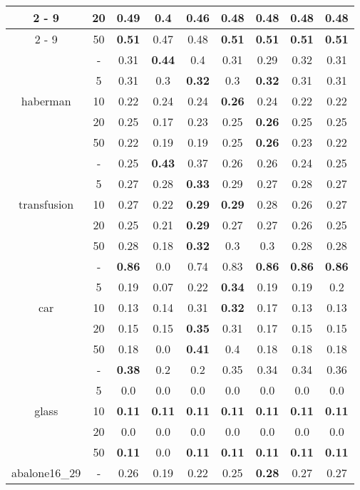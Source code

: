 \documentclass{article}%
\begin{document}
\begin{longtable}{c|c|ccccccc}
\cline{2%
-%
9}%
&20&\textbf{0.49}&0.4&0.46&0.48&0.48&0.48&0.48\\%
\cline{2%
-%
9}%
&50&\textbf{0.51}&0.47&0.48&\textbf{0.51}&\textbf{0.51}&\textbf{0.51}&\textbf{0.51}\\%
\hline%
\multirow{5}{*}{haberman}&{-}&0.31&\textbf{0.44}&0.4&0.31&0.29&0.32&0.31\\%
\cline{2%
-%
9}%
&5&0.31&0.3&\textbf{0.32}&0.3&\textbf{0.32}&0.31&0.31\\%
\cline{2%
-%
9}%
&10&0.22&0.24&0.24&\textbf{0.26}&0.24&0.22&0.22\\%
\cline{2%
-%
9}%
&20&0.25&0.17&0.23&0.25&\textbf{0.26}&0.25&0.25\\%
\cline{2%
-%
9}%
&50&0.22&0.19&0.19&0.25&\textbf{0.26}&0.23&0.22\\%
\hline%
\multirow{5}{*}{transfusion}&{-}&0.25&\textbf{0.43}&0.37&0.26&0.26&0.24&0.25\\%
\cline{2%
-%
9}%
&5&0.27&0.28&\textbf{0.33}&0.29&0.27&0.28&0.27\\%
\cline{2%
-%
9}%
&10&0.27&0.22&\textbf{0.29}&\textbf{0.29}&0.28&0.26&0.27\\%
\cline{2%
-%
9}%
&20&0.25&0.21&\textbf{0.29}&0.27&0.27&0.26&0.25\\%
\cline{2%
-%
9}%
&50&0.28&0.18&\textbf{0.32}&0.3&0.3&0.28&0.28\\%
\hline%
\multirow{5}{*}{car}&{-}&\textbf{0.86}&0.0&0.74&0.83&\textbf{0.86}&\textbf{0.86}&\textbf{0.86}\\%
\cline{2%
-%
9}%
&5&0.19&0.07&0.22&\textbf{0.34}&0.19&0.19&0.2\\%
\cline{2%
-%
9}%
&10&0.13&0.14&0.31&\textbf{0.32}&0.17&0.13&0.13\\%
\cline{2%
-%
9}%
&20&0.15&0.15&\textbf{0.35}&0.31&0.17&0.15&0.15\\%
\cline{2%
-%
9}%
&50&0.18&0.0&\textbf{0.41}&0.4&0.18&0.18&0.18\\%
\hline%
\multirow{5}{*}{glass}&{-}&\textbf{0.38}&0.2&0.2&0.35&0.34&0.34&0.36\\%
\cline{2%
-%
9}%
&5&0.0&0.0&0.0&0.0&0.0&0.0&0.0\\%
\cline{2%
-%
9}%
&10&\textbf{0.11}&\textbf{0.11}&\textbf{0.11}&\textbf{0.11}&\textbf{0.11}&\textbf{0.11}&\textbf{0.11}\\%
\cline{2%
-%
9}%
&20&0.0&0.0&0.0&0.0&0.0&0.0&0.0\\%
\cline{2%
-%
9}%
&50&\textbf{0.11}&0.0&\textbf{0.11}&\textbf{0.11}&\textbf{0.11}&\textbf{0.11}&\textbf{0.11}\\%
\hline%
\multirow{5}{*}{abalone16\_29}&{-}&0.26&0.19&0.22&0.25&\textbf{0.28}&0.27&0.27\\%

\end{longtable}
\end{document}
